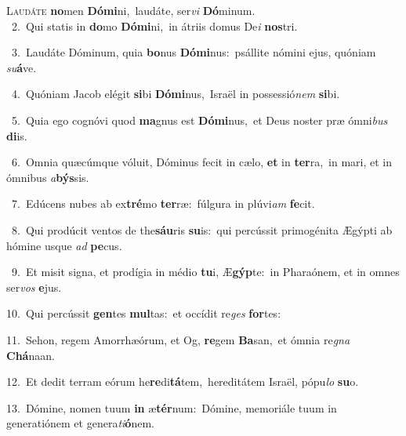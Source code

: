 \lettrine{\initial\textcolor{\initialcolor}{L}}{audáte} \textbf{no}\-men \textbf{Dó}\-\textbf{mi}ni,~\star laudáte, ser\textit{vi} \textbf{Dó}\-minum.\\
{\numbfont\textcolor{\numbcolor}{~2.}}~Qui statis in \textbf{do}\-mo \textbf{Dó}\-\textbf{mi}ni,~\star in átriis domus De\textit{i} \textbf{nos}\-tri.\par
{\numbfont\textcolor{\numbcolor}{~3.}}~Laudáte Dóminum, quia \textbf{bo}\-nus \textbf{Dó}\-\textbf{mi}nus:~\star psállite nómini ejus, quóniam \textit{su}\-\textbf{á}ve.\par
{\numbfont\textcolor{\numbcolor}{~4.}}~Quóniam Jacob elégit \textbf{si}\-bi \textbf{Dó}\-\textbf{mi}nus,~\star Israël in possessió\textit{nem} \textbf{si}\-bi.\par
{\numbfont\textcolor{\numbcolor}{~5.}}~Quia ego cognóvi quod \textbf{ma}\-gnus est \textbf{Dó}\-\textbf{mi}nus,~\star et Deus noster præ ómni\textit{bus} \textbf{di}\-is.\par
{\numbfont\textcolor{\numbcolor}{~6.}}~Omnia quæcúmque vóluit, Dóminus fecit in cælo, \textbf{et} in \textbf{ter}\-ra,~\star in mari, et in ómnibus \textit{a}\-\textbf{býs}sis.\par
{\numbfont\textcolor{\numbcolor}{~7.}}~Edúcens nubes ab ex\-\textbf{tré}\-mo \textbf{ter}\-ræ:~\star fúlgura in plúvi\textit{am} \textbf{fe}\-cit.\par
{\numbfont\textcolor{\numbcolor}{~8.}}~Qui prodúcit ventos de the\-\textbf{sáu}\-ris \textbf{su}\-is:~\star qui percússit primogénita Ægýpti ab hómine usque \textit{ad} \textbf{pe}\-cus.\par
{\numbfont\textcolor{\numbcolor}{~9.}}~Et misit signa, et prodígia in médio \textbf{tu}\-i, Æ\-\textbf{gýp}\-te:~\star in Pharaónem, et in omnes ser\textit{vos} \textbf{e}\-jus.\par
{\numbfont\textcolor{\numbcolor}{10.}}~Qui percússit \textbf{gen}\-tes \textbf{mul}\-tas:~\star et occídit re\textit{ges} \textbf{for}\-tes:\par
{\numbfont\textcolor{\numbcolor}{11.}}~Sehon, regem Amorrhæórum, et Og, \textbf{re}\-gem \textbf{Ba}\-san,~\star et ómnia re\textit{gna} \textbf{Chá}\-naan.\par
{\numbfont\textcolor{\numbcolor}{12.}}~Et dedit terram eórum he\-\textbf{re}\-di\-\textbf{tá}\-tem,~\star hereditátem Israël, pópu\textit{lo} \textbf{su}\-o.\par
{\numbfont\textcolor{\numbcolor}{13.}}~Dómine, nomen tuum \textbf{in} æ\-\textbf{tér}\-num:~\star Dómine, memoriále tuum in generatiónem et genera\-\textit{ti}\-\textbf{ó}nem.\par
